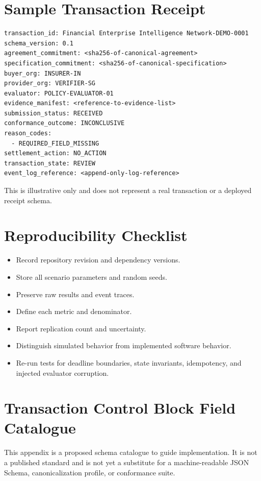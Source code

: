 \documentclass[12pt,a4paper,oneside]{report}
\begin{document}
\appendix
\chapter{Sample Transaction Receipt}
\begin{verbatim}
transaction_id: Financial Enterprise Intelligence Network-DEMO-0001
schema_version: 0.1
agreement_commitment: <sha256-of-canonical-agreement>
specification_commitment: <sha256-of-canonical-specification>
buyer_org: INSURER-IN
provider_org: VERIFIER-SG
evaluator: POLICY-EVALUATOR-01
evidence_manifest: <reference-to-evidence-list>
submission_status: RECEIVED
conformance_outcome: INCONCLUSIVE
reason_codes:
  - REQUIRED_FIELD_MISSING
settlement_action: NO_ACTION
transaction_state: REVIEW
event_log_reference: <append-only-log-reference>
\end{verbatim}
This is illustrative only and does not represent a real transaction or a deployed receipt schema.

\chapter{Reproducibility Checklist}
\begin{itemize}[leftmargin=*]
\item Record repository revision and dependency versions.
\item Store all scenario parameters and random seeds.
\item Preserve raw results and event traces.
\item Define each metric and denominator.
\item Report replication count and uncertainty.
\item Distinguish simulated behavior from implemented software behavior.
\item Re-run tests for deadline boundaries, state invariants, idempotency, and injected evaluator corruption.
\end{itemize}

\chapter{Transaction Control Block Field Catalogue}
This appendix is a proposed schema catalogue to guide implementation. It is not a published standard and is not yet a substitute for a machine-readable JSON Schema, canonicalization profile, or conformance suite.
\end{document}
